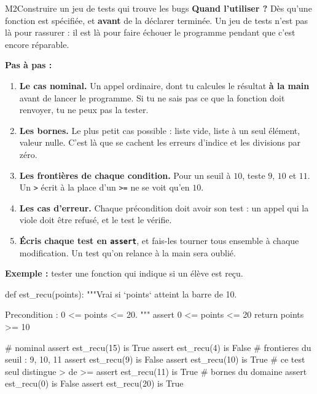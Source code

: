 \begin{fichemethode}{M2}{Construire un jeu de tests qui trouve les bugs}
\textbf{Quand l'utiliser ?} Dès qu'une fonction est spécifiée, et \textbf{avant} de la
déclarer terminée. Un jeu de tests n'est pas là pour rassurer : il est là pour faire
échouer le programme pendant que c'est encore réparable.

\textbf{Pas à pas :}
\begin{enumerate}
  \item \textbf{Le cas nominal.} Un appel ordinaire, dont tu calcules le résultat
    \textbf{à la main} avant de lancer le programme. Si tu ne sais pas ce que la fonction
    doit renvoyer, tu ne peux pas la tester.
  \item \textbf{Les bornes.} Le plus petit cas possible : liste vide, liste à un seul
    élément, valeur nulle. C'est là que se cachent les erreurs d'indice et les divisions
    par zéro.
  \item \textbf{Les frontières de chaque condition.} Pour un seuil à $10$, teste $9$, $10$
    et $11$. Un \lstinline{>} écrit à la place d'un \lstinline{>=} ne se voit qu'en $10$.
  \item \textbf{Les cas d'erreur.} Chaque précondition doit avoir son test : un appel qui la
    viole doit être refusé, et le test le vérifie.
  \item \textbf{Écris chaque test en \lstinline{assert}}, et fais-les tourner tous ensemble à
    chaque modification. Un test qu'on relance à la main sera oublié.
\end{enumerate}

\textbf{Exemple :} tester une fonction qui indique si un élève est reçu.

\begin{python}
def est_recu(points):
    """Vrai si `points` atteint la barre de 10.

    Precondition : 0 <= points <= 20.
    """
    assert 0 <= points <= 20
    return points >= 10

# nominal
assert est_recu(15) is True
assert est_recu(4) is False
# frontieres du seuil : 9, 10, 11
assert est_recu(9) is False
assert est_recu(10) is True      # ce test seul distingue > de >=
assert est_recu(11) is True
# bornes du domaine
assert est_recu(0) is False
assert est_recu(20) is True
\end{python}


\end{fichemethode}
